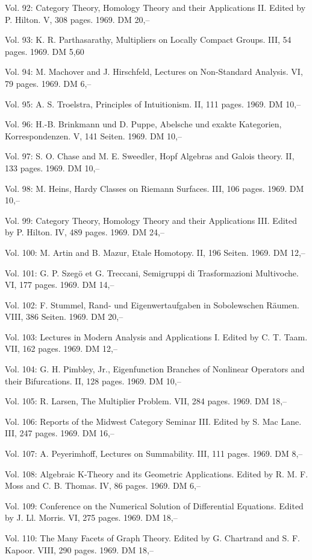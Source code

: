 Vol. 92: Category Theory, Homology Theory and their Applications II. Edited by P. Hilton. V, 308 pages. 1969. DM 20,--

Vol. 93: K. R. Parthasarathy, Multipliers on Locally Compact Groups. III, 54 pages. 1969. DM 5,60

Vol. 94: M. Machover and J. Hirschfeld, Lectures on Non-Standard Analysis. VI, 79 pages. 1969. DM 6,--

Vol. 95: A. S. Troelstra, Principles of Intuitionism. II, 111 pages. 1969. DM 10,--

Vol. 96: H.-B. Brinkmann und D. Puppe, Abelsche und exakte Kategorien, Korrespondenzen. V, 141 Seiten. 1969. DM 10,--

Vol. 97: S. O. Chase and M. E. Sweedler, Hopf Algebras and Galois theory. II, 133 pages. 1969. DM 10,--

Vol. 98: M. Heins, Hardy Classes on Riemann Surfaces. III, 106 pages. 1969. DM 10,--

Vol. 99: Category Theory, Homology Theory and their Applications III. Edited by P. Hilton. IV, 489 pages. 1969. DM 24,--

Vol. 100: M. Artin and B. Mazur, Etale Homotopy. II, 196 Seiten. 1969. DM 12,--

Vol. 101: G. P. Szegö et G. Treccani, Semigruppi di Trasformazioni Multivoche. VI, 177 pages. 1969. DM 14,--

Vol. 102: F. Stummel, Rand- und Eigenwertaufgaben in Sobolewschen Räumen. VIII, 386 Seiten. 1969. DM 20,--

Vol. 103: Lectures in Modern Analysis and Applications I. Edited by C. T. Taam. VII, 162 pages. 1969. DM 12,--

Vol. 104: G. H. Pimbley, Jr., Eigenfunction Branches of Nonlinear Operators and their Bifurcations. II, 128 pages. 1969. DM 10,--

Vol. 105: R. Larsen, The Multiplier Problem. VII, 284 pages. 1969. DM 18,--

Vol. 106: Reports of the Midwest Category Seminar III. Edited by S. Mac Lane. III, 247 pages. 1969. DM 16,--

Vol. 107: A. Peyerimhoff, Lectures on Summability. III, 111 pages. 1969. DM 8,--

Vol. 108: Algebraic K-Theory and its Geometric Applications. Edited by R. M. F. Moss and C. B. Thomas. IV, 86 pages. 1969. DM 6,--

Vol. 109: Conference on the Numerical Solution of Differential Equations. Edited by J. Ll. Morris. VI, 275 pages. 1969. DM 18,--

Vol. 110: The Many Facets of Graph Theory. Edited by G. Chartrand and S. F. Kapoor. VIII, 290 pages. 1969. DM 18,--

